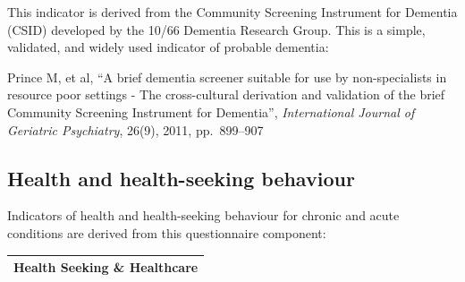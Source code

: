 \documentclass[12pt,a4paper]{book}
\theoremstyle{definition}
\theoremstyle{definition}
\theoremstyle{definition}
\theoremstyle{remark}
\begin{document}
This indicator is derived from the Community Screening Instrument for
Dementia (CSID) developed by the 10/66 Dementia Research Group. This is
a simple, validated, and widely used indicator of probable dementia:

Prince M, et al, ``A brief dementia screener suitable for use by
non-specialists in resource poor settings - The cross-cultural
derivation and validation of the brief Community Screening Instrument
for Dementia'', \emph{International Journal of Geriatric Psychiatry},
26(9), 2011, pp.~899--907

\hypertarget{health-and-health-seeking-behaviour}{%
\subsection{Health and health-seeking
behaviour}\label{health-and-health-seeking-behaviour}}

Indicators of health and health-seeking behaviour for chronic and acute
conditions are derived from this questionnaire component:

\begin{longtable}[]{@{}c@{}}
\toprule
\begin{minipage}[t]{0.97\columnwidth}\centering
\textbf{Health Seeking \& Healthcare}\strut
\end{minipage}\tabularnewline
\bottomrule
\end{longtable}
\end{document}
